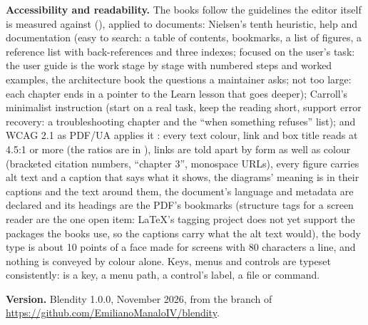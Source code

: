 \textbf{Accessibility and readability.} The books follow the guidelines the editor itself is measured against
(), applied to documents: Nielsen's tenth heuristic, help and documentation \cite{Nielsen1994Enhancing,
Nielsen1993} (easy to search: a table of contents, bookmarks, a list of figures, a reference list with back-references
and three indexes; focused on the user's task: the user guide is the work stage by stage with numbered steps and worked
examples, the architecture book the questions a maintainer asks; not too large: each chapter ends in a pointer to the
Learn lesson that goes deeper); Carroll's minimalist instruction \cite{Carroll1990} (start on a real task, keep the
reading short, support error recovery: a troubleshooting chapter and the ``when something refuses'' list); and WCAG 2.1
\cite{W3C2018Web} as PDF/UA applies it \cite{PDFUA2024}: every text colour, link and box title reads at 4.5:1 or more
(the ratios are in ), links are told apart by form as well as colour (bracketed citation
numbers, ``chapter 3'', monospace URLs), every figure carries alt text and a caption that says what it shows, the
diagrams' meaning is in their captions and the text around them, the document's language and metadata are declared
and its headings are the PDF's bookmarks (structure tags for a screen reader are the one open item: LaTeX's tagging
project does not yet support the packages the books use, so the captions carry what the alt text would), the body
type is about 10 points of a face made for screens with 80 characters a line, and nothing is conveyed by colour
alone. Keys, menus and controls are
typeset consistently:  is a key,  a menu path,  a control's
label,  a file or command.

\textbf{Version.} Blendity 1.0.0, November 2026, from the  branch of
\url{https://github.com/EmilianoManaloIV/blendity}.
